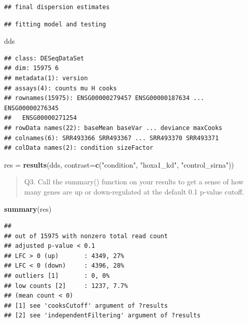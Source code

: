 \documentclass[
]{article}
\newenvironment{Shaded}{\begin{snugshade}}{\end{snugshade}}
\newcommand{\AttributeTok}[1]{\textcolor[rgb]{0.13,0.29,0.53}{#1}}
\newcommand{\FunctionTok}[1]{\textcolor[rgb]{0.13,0.29,0.53}{\textbf{#1}}}
\newcommand{\NormalTok}[1]{#1}
\newcommand{\OtherTok}[1]{\textcolor[rgb]{0.56,0.35,0.01}{#1}}
\newcommand{\StringTok}[1]{\textcolor[rgb]{0.31,0.60,0.02}{#1}}
\begin{document}
\begin{verbatim}
## final dispersion estimates
\end{verbatim}

\begin{verbatim}
## fitting model and testing
\end{verbatim}

\begin{Shaded}
\begin{Highlighting}[]
\NormalTok{dds}
\end{Highlighting}
\end{Shaded}

\begin{verbatim}
## class: DESeqDataSet 
## dim: 15975 6 
## metadata(1): version
## assays(4): counts mu H cooks
## rownames(15975): ENSG00000279457 ENSG00000187634 ... ENSG00000276345
##   ENSG00000271254
## rowData names(22): baseMean baseVar ... deviance maxCooks
## colnames(6): SRR493366 SRR493367 ... SRR493370 SRR493371
## colData names(2): condition sizeFactor
\end{verbatim}

\begin{Shaded}
\begin{Highlighting}[]
\NormalTok{res }\OtherTok{=} \FunctionTok{results}\NormalTok{(dds, }\AttributeTok{contrast=}\FunctionTok{c}\NormalTok{(}\StringTok{"condition"}\NormalTok{, }\StringTok{"hoxa1\_kd"}\NormalTok{, }\StringTok{"control\_sirna"}\NormalTok{))}
\end{Highlighting}
\end{Shaded}

\begin{quote}
Q3. Call the summary() function on your results to get a sense of how
many genes are up or down-regulated at the default 0.1 p-value cutoff.
\end{quote}

\begin{Shaded}
\begin{Highlighting}[]
\FunctionTok{summary}\NormalTok{(res)}
\end{Highlighting}
\end{Shaded}

\begin{verbatim}
## 
## out of 15975 with nonzero total read count
## adjusted p-value < 0.1
## LFC > 0 (up)       : 4349, 27%
## LFC < 0 (down)     : 4396, 28%
## outliers [1]       : 0, 0%
## low counts [2]     : 1237, 7.7%
## (mean count < 0)
## [1] see 'cooksCutoff' argument of ?results
## [2] see 'independentFiltering' argument of ?results
\end{verbatim}
\end{document}
